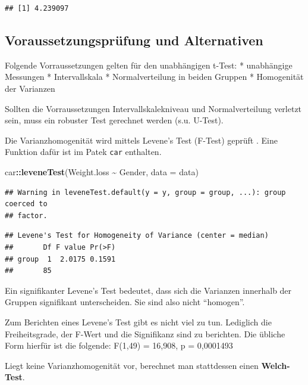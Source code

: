 \documentclass[
]{book}
\newenvironment{Shaded}{\begin{snugshade}}{\end{snugshade}}
\newcommand{\AttributeTok}[1]{\textcolor[rgb]{0.13,0.29,0.53}{#1}}
\newcommand{\FunctionTok}[1]{\textcolor[rgb]{0.13,0.29,0.53}{\textbf{#1}}}
\newcommand{\NormalTok}[1]{#1}
\newcommand{\SpecialCharTok}[1]{\textcolor[rgb]{0.81,0.36,0.00}{\textbf{#1}}}
\begin{document}
\begin{verbatim}
## [1] 4.239097
\end{verbatim}

\subsection{Voraussetzungsprüfung und Alternativen}\label{voraussetzungspruxfcfung-und-alternativen}

Folgende Vorraussetzungen gelten für den unabhängigen t-Test:
* unabhängige Messungen
* Intervallskala
* Normalverteilung in beiden Gruppen
* Homogenität der Varianzen

Sollten die Vorraussetzungen Intervallskalekniveau und Normalverteilung verletzt sein, muss ein robuster Test gerechnet werden (s.u. U-Test).

Die Varianzhomogenität wird mittels Levene's Test (F-Test) geprüft \citet{levene1960robust}. Eine Funktion dafür ist im Patek \texttt{car} enthalten.

\begin{Shaded}
\begin{Highlighting}[]
\NormalTok{car}\SpecialCharTok{::}\FunctionTok{leveneTest}\NormalTok{(Weight.loss }\SpecialCharTok{\textasciitilde{}}\NormalTok{ Gender, }\AttributeTok{data =}\NormalTok{ data)}
\end{Highlighting}
\end{Shaded}

\begin{verbatim}
## Warning in leveneTest.default(y = y, group = group, ...): group coerced to
## factor.
\end{verbatim}

\begin{verbatim}
## Levene's Test for Homogeneity of Variance (center = median)
##       Df F value Pr(>F)
## group  1  2.0175 0.1591
##       85
\end{verbatim}

Ein signifikanter Levene's Test bedeutet, dass sich die Varianzen innerhalb der Gruppen signifikant unterscheiden. Sie sind also nicht ``homogen''.

Zum Berichten eines Levene's Test gibt es nicht viel zu tun. Lediglich die Freiheitsgrade, der F-Wert und die Signifikanz sind zu berichten. Die übliche Form hierfür ist die folgende: F(1,49) = 16,908, p = 0,0001493

Liegt keine Varianzhomogenität vor, berechnet man stattdessen einen \textbf{Welch-Test}.
\end{document}
